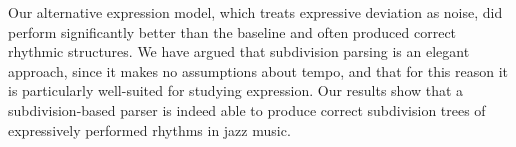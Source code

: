 Our alternative expression model, which treats expressive deviation as noise, did perform significantly better than the baseline and often produced correct rhythmic structures. We have argued that subdivision parsing is an elegant approach, since it makes no assumptions about tempo, and that for this reason it is particularly well-suited for studying expression. Our results show that a subdivision-based parser is indeed able to produce correct subdivision trees of expressively performed rhythms in jazz music.